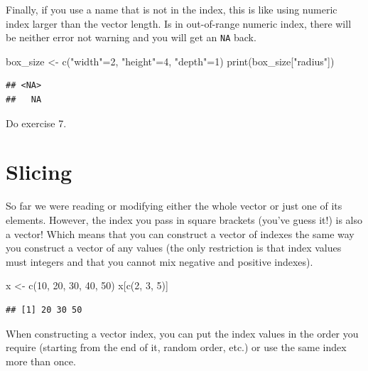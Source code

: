 \documentclass[
]{book}
\newenvironment{Shaded}{\begin{snugshade}}{\end{snugshade}}
\newcommand{\DecValTok}[1]{\textcolor[rgb]{0.00,0.00,0.81}{#1}}
\newcommand{\FunctionTok}[1]{\textcolor[rgb]{0.00,0.00,0.00}{#1}}
\newcommand{\NormalTok}[1]{#1}
\newcommand{\OtherTok}[1]{\textcolor[rgb]{0.56,0.35,0.01}{#1}}
\newcommand{\StringTok}[1]{\textcolor[rgb]{0.31,0.60,0.02}{#1}}
\begin{document}
Finally, if you use a name that is not in the index, this is like using numeric index larger than the vector length. Is in out-of-range numeric index, there will be neither error not warning and you will get an \texttt{NA} back.

\begin{Shaded}
\begin{Highlighting}[]
\NormalTok{box\_size }\OtherTok{\textless{}{-}} \FunctionTok{c}\NormalTok{(}\StringTok{"width"}\OtherTok{=}\DecValTok{2}\NormalTok{, }\StringTok{"height"}\OtherTok{=}\DecValTok{4}\NormalTok{, }\StringTok{"depth"}\OtherTok{=}\DecValTok{1}\NormalTok{) }
\FunctionTok{print}\NormalTok{(box\_size[}\StringTok{"radius"}\NormalTok{])}
\end{Highlighting}
\end{Shaded}

\begin{verbatim}
## <NA> 
##   NA
\end{verbatim}

Do exercise 7.

\hypertarget{vector-index-slicing}{%
\section{Slicing}\label{vector-index-slicing}}

So far we were reading or modifying either the whole vector or just one of its elements. However, the index you pass in square brackets (you've guess it!) is also a vector! Which means that you can construct a vector of indexes the same way you construct a vector of any values (the only restriction is that index values must integers and that you cannot mix negative and positive indexes).

\begin{Shaded}
\begin{Highlighting}[]
\NormalTok{x }\OtherTok{\textless{}{-}} \FunctionTok{c}\NormalTok{(}\DecValTok{10}\NormalTok{, }\DecValTok{20}\NormalTok{, }\DecValTok{30}\NormalTok{, }\DecValTok{40}\NormalTok{, }\DecValTok{50}\NormalTok{)}
\NormalTok{x[}\FunctionTok{c}\NormalTok{(}\DecValTok{2}\NormalTok{, }\DecValTok{3}\NormalTok{, }\DecValTok{5}\NormalTok{)]}
\end{Highlighting}
\end{Shaded}

\begin{verbatim}
## [1] 20 30 50
\end{verbatim}

When constructing a vector index, you can put the index values in the order you require (starting from the end of it, random order, etc.) or use the same index more than once.
\end{document}
